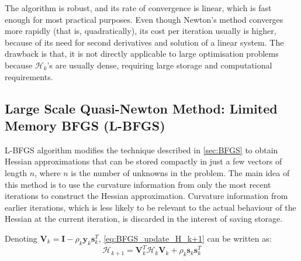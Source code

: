 The algorithm is robust, and its rate of convergence is linear, which is fast enough for most practical purposes. Even though Newton's method converges more rapidly (that is, quadratically), its cost per iteration usually is higher, because of its need for second derivatives and solution of a linear system. The drawback is that, it is not directly applicable to large optimisation problems because $\mathcal{H}_k$'s are usually dense, requiring large storage and computational requirements. \cite{Nocedal2006}


\subsection{Large Scale Quasi-Newton Method: Limited Memory BFGS (L-BFGS)}\label{sec:L-BFGS}
L-BFGS algorithm \cite{Liu1989} modifies the technique described in \cref{sec:BFGS} to obtain Hessian approximations that can be stored compactly in just a few vectors of length $n$, where $n$ is the number of unknowns in the problem. The main idea of this method is to use the curvature information from only the most recent iterations to construct the Hessian approximation. Curvature information from earlier iterations, which is less likely to be relevant to the actual behaviour of the Hessian at the current iteration, is discarded in the interest of saving storage. \cite{Nocedal2006}

Denoting $\textbf{V}_k = \textbf{I} - \rho_k\textbf{y}_k\textbf{s}_k^T$, \cref{eq:BFGS_update_H_k+1} can be written as:
\begin{equation}
  \mathcal{H}_{k+1} = \textbf{V}_k^T \mathcal{H}_{k} \textbf{V}_k +\rho_k\textbf{s}_k\textbf{s}_k^T
\end{equation}

